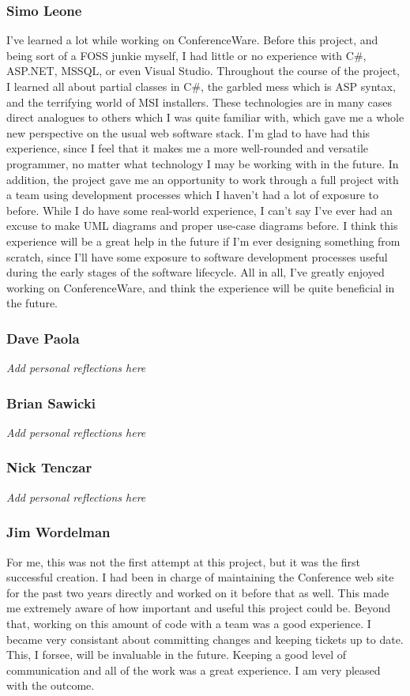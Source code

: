 \documentclass[12pt]{article}
\begin{document}
\subsubsection{Simo Leone}
I've learned a lot while working on ConferenceWare. Before this project, and
being sort of a FOSS junkie myself, I had little or no experience with
C\#, ASP.NET, MSSQL, or even Visual Studio. Throughout the course of the project,
I learned all about partial classes in C\#, the garbled mess which is ASP syntax,
and the terrifying world of MSI installers. These technologies are in many cases
direct analogues to others which I was quite familiar with, which gave me a
whole new perspective on the usual web software stack. I'm glad to have had this
experience, since I feel that it makes me a more well-rounded and versatile
programmer, no matter what technology I may be working with in the future. In
addition, the project gave me an opportunity to work through a full project
with a team using development processes which I haven't had a lot of exposure
to before. While I do have some real-world experience, I can't say I've ever
had an excuse to make UML diagrams and proper use-case diagrams before. I
think this experience will be a great help in the future if I'm ever designing
something from scratch, since I'll have some exposure to software development
processes useful during the early stages of the software lifecycle. All in all,
I've greatly enjoyed working on ConferenceWare, and think the experience will
be quite beneficial in the future.
\subsubsection{Dave Paola}
\textit{Add personal reflections here}
\subsubsection{Brian Sawicki}
\textit{Add personal reflections here}
\subsubsection{Nick Tenczar}
\textit{Add personal reflections here}
\subsubsection{Jim Wordelman}
For me, this was not the first attempt at this project, but it was the first
successful creation. I had been in charge of maintaining the Conference web site
for the past two years directly and worked on it before that as well. This made
me extremely aware of how important and useful this project could be. Beyond
that, working on this amount of code with a team was a good experience. I became
very consistant about committing changes and keeping tickets up to date. This, I
forsee, will be invaluable in the future. Keeping a good level of communication
and all of the work was a great experience. I am very pleased with the outcome.
\newpage
\end{document}
